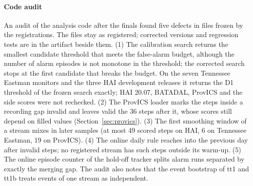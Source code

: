 \documentclass[sigconf]{acmart}
\begin{document}
\paragraph{Code audit}
An audit of the analysis code after the finals found five defects in files frozen by the registrations.
The files stay as registered; corrected versions and regression tests are in the artifact beside them.
(1) The calibration search returns the smallest candidate threshold that meets the false-alarm budget,
although the number of alarm episodes is not monotone in the threshold; the corrected search stops at the
first candidate that breaks the budget. On the seven Tennessee Eastman monitors and the three HAI
development releases it returns the D1 threshold of the frozen search exactly; HAI 20.07, BATADAL, ProvICS
and the side scores were not rechecked. (2) The ProvICS loader marks the steps inside
a recording gap invalid and leaves valid the 36 steps after it, whose scores still depend on filled
values (Section~\ref{sec:provics}). (3) The first smoothing window of a stream mixes in later samples
(at most 49 scored steps on HAI, 6 on Tennessee Eastman, 19 on ProvICS). (4) The online daily rule reaches
into the previous day after invalid steps; no registered stream has such steps outside its warm-up. (5)
The online episode counter of the hold-off tracker splits alarm runs separated by exactly the merging
gap. The audit also notes that the event bootstrap of tt1 and tt1b treats events of one stream as
independent.

\FloatBarrier
\end{document}
